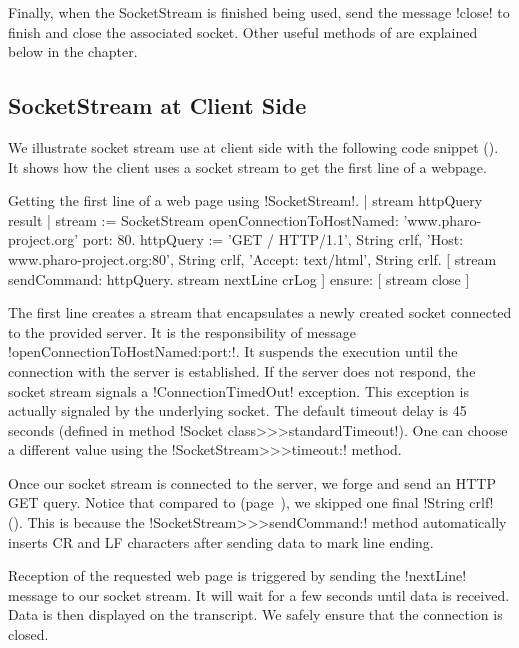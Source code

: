 \documentclass[a4paper,10pt,twoside]{book}
\begin{document}
Finally, when the SocketStream is finished being used, send the message \ct!close! to finish and close the associated socket. Other useful methods of  are explained below in the chapter.

\subsection{SocketStream at Client Side}
We illustrate socket stream use at client side with the following code snippet ().
It shows how the client uses a socket stream to get the first line of a webpage.

\begin{script}{Getting the first line of a web page using \ct!SocketStream!.}
	| stream httpQuery result |
	stream := SocketStream 
			openConnectionToHostNamed: 'www.pharo-project.org' 
			port: 80.
	httpQuery := 'GET / HTTP/1.1', String crlf, 
		'Host: www.pharo-project.org:80', String crlf, 
		'Accept: text/html', String crlf.
	[ stream sendCommand: httpQuery.
	stream nextLine crLog ] ensure: [ stream close ]
\end{script}

The first line creates a stream that encapsulates a newly created socket connected to the provided server.
It is the responsibility of message \ct!openConnectionToHostNamed:port:!.
It suspends the execution until the connection with the server is established.
If the server does not respond, the socket stream signals a \ct!ConnectionTimedOut! exception.
This exception is actually signaled by the underlying socket.
The default timeout delay is 45 seconds (defined in method \ct!Socket class>>>standardTimeout!).
One can choose a different value using the \ct!SocketStream>>>timeout:! method.

Once our socket stream is connected to the server, we forge and send an HTTP GET query.
Notice that compared to  (page~\pageref{scr:script:closeAndDestroy}), we skipped one final \ct!String crlf! ().
This is because the \ct!SocketStream>>>sendCommand:! method automatically inserts CR and LF characters after sending data to mark line ending.

Reception of the requested web page is triggered by sending the \ct!nextLine! message to our socket stream.
It will wait for a few seconds until data is received.
Data is then displayed on the transcript.
We safely ensure that the connection is closed.
\end{document}

